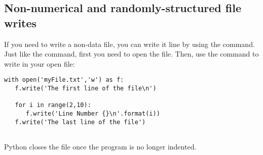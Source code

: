 \subsection*{Non-numerical and randomly-structured file writes}
If you need to write a non-data file, you can write it line by using the  command.  Just like the  command, first you need to open the file. Then, use the  command to write in your open file:
\begin{Verbatim}
with open('myFile.txt','w') as f:
   f.write('The first line of the file\n')

   for i in range(2,10):
      f.write('Line Number {}\n'.format(i))
   f.write('The last line of the file')


\end{Verbatim}
Python closes the file once the program is no longer indented.





